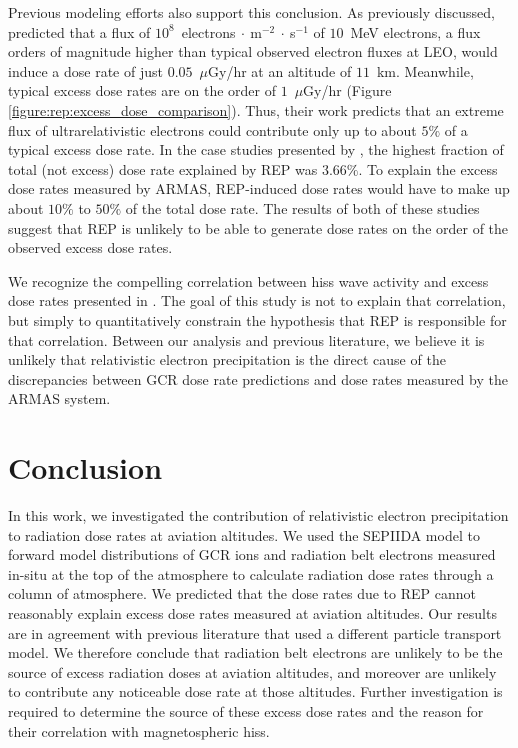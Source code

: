 \documentclass[draft]{agujournal2019}
\newcommand{\ugy}{$\mu$Gy}
\begin{document}
Previous modeling efforts also support this conclusion. As previously discussed,  predicted that a flux of $10^8$~electrons$~\cdot~$m$^{-2}~\cdot~$s$^{-1}$ of $10$~MeV electrons, a flux orders of magnitude higher than typical observed electron fluxes at LEO, would induce a dose rate of just $0.05$~{\ugy}/hr at an altitude of $11$~km. Meanwhile, typical excess dose rates are on the order of $1$~{\ugy}/hr (Figure \ref{figure:rep:excess_dose_comparison}). Thus, their work predicts that an extreme flux of ultrarelativistic electrons could contribute only up to about $5\%$ of a typical excess dose rate. In the case studies presented by , the highest fraction of total (not excess) dose rate explained by REP was $3.66\%$. To explain the excess dose rates measured by ARMAS, REP-induced dose rates would have to make up about $10\%$ to $50\%$ of the total dose rate. The results of both of these studies suggest that REP is unlikely to be able to generate dose rates on the order of the observed excess dose rates.

We recognize the compelling correlation between hiss wave activity and excess dose rates presented in . The goal of this study is not to explain that correlation, but simply to quantitatively constrain the hypothesis that REP is responsible for that correlation. Between our analysis and previous literature, we believe it is unlikely that relativistic electron precipitation is the direct cause of the discrepancies between GCR dose rate predictions and dose rates measured by the ARMAS system.

\section{Conclusion}
In this work, we investigated the contribution of relativistic electron precipitation to radiation dose rates at aviation altitudes. We used the SEPIIDA model to forward model distributions of GCR ions and radiation belt electrons measured in-situ at the top of the atmosphere to calculate radiation dose rates through a column of atmosphere. We predicted that the dose rates due to REP cannot reasonably explain excess dose rates measured at aviation altitudes. Our results are in agreement with previous literature that used a different particle transport model. We therefore conclude that radiation belt electrons are unlikely to be the source of excess radiation doses at aviation altitudes, and moreover are unlikely to contribute any noticeable dose rate at those altitudes. Further investigation is required to determine the source of these excess dose rates and the reason for their correlation with magnetospheric hiss.
\end{document}
